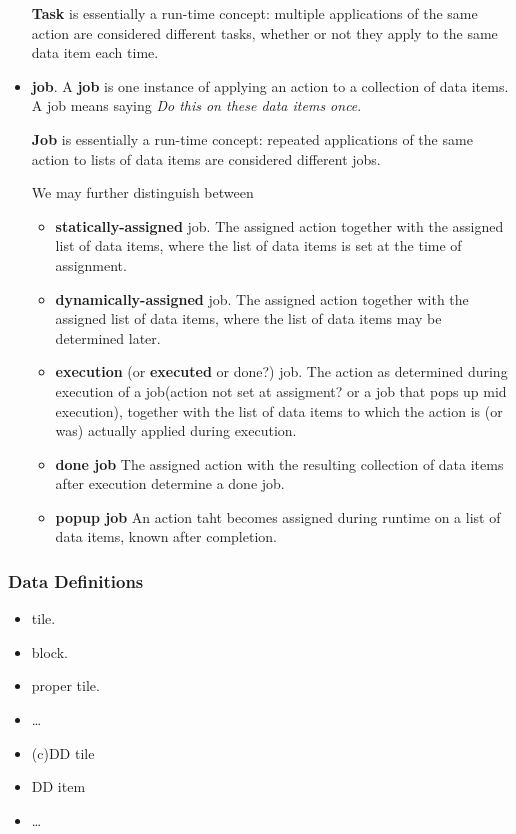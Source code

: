 \documentclass{article}
\begin{document}
\begin{itemize}
 \textbf{Task} is essentially a run-time concept:
multiple applications of the same action are considered
different tasks, whether or not they apply to the same data item each time.

\item \textbf{job}.
A \textbf{job} is one instance of applying an action to a collection of data items.
A job
means saying \textit{Do this on these data items once}.

\textbf{Job} is essentially a run-time concept:
repeated applications of the same action to lists of data items are considered
different jobs.  \


We may further distinguish between
\begin{itemize}
\item \textbf{statically-assigned} job. The assigned action together with
the assigned list of data items, where the list of data items is set at the time of assignment. \
\item \textbf{dynamically-assigned} job. The assigned action together with
the assigned list of data items, where the list of data items may be determined later.
\item \textbf{execution} (or \textbf{executed} or done?) job. The action as
determined during execution of a job(action not set at assigment? or a job that pops up mid execution), together with
the list of data items to which the action is (or was) actually
applied during execution.
\item \textbf{done job} The assigned action with the resulting collection of data items after execution determine a done job.
\item \textbf{popup job} An action taht becomes assigned during runtime on a list of data items, known after completion.
\end{itemize}

\end{itemize}

\subsubsection{Data Definitions}
\begin{itemize}
\item tile.
\item block.
\item proper tile.
\item \ldots
\item (c)DD tile
\item DD item
\item \ldots
\end{itemize}
\end{document}
